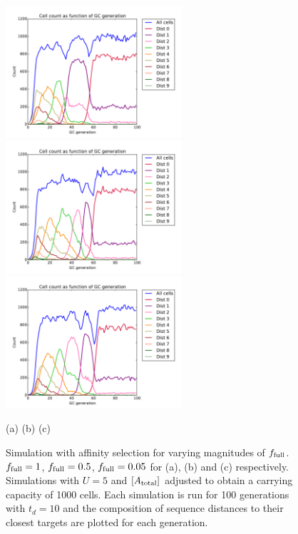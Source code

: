 \begin{figure}[!ht]
\begin{center}
\includegraphics[height=49mm]{figures/f_full_1.pdf}
\includegraphics[height=49mm]{figures/f_full_05.pdf}
\includegraphics[height=49mm]{figures/f_full_005.pdf} \newline%
\end{center}
\vspace{-8mm} \hspace{23mm} (a) \hspace{37mm} (b) \hspace{37mm} (c)
    \caption{
        \label{fig:no_effect_of_f_full}
        Simulation with affinity selection for varying magnitudes of $f_{\text{full}}$.
        $f_{\text{full}}=1$, $f_{\text{full}}=0.5$, $f_{\text{full}}=0.05$ for (a), (b) and (c) respectively. Simulations with $U=5$ and $[A_{\text{total}}]$ adjusted to obtain a carrying capacity of 1000 cells. Each simulation is run for 100 generations with $t_d=10$ and the composition of sequence distances to their closest targets are plotted for each generation.
        }
\end{figure}

